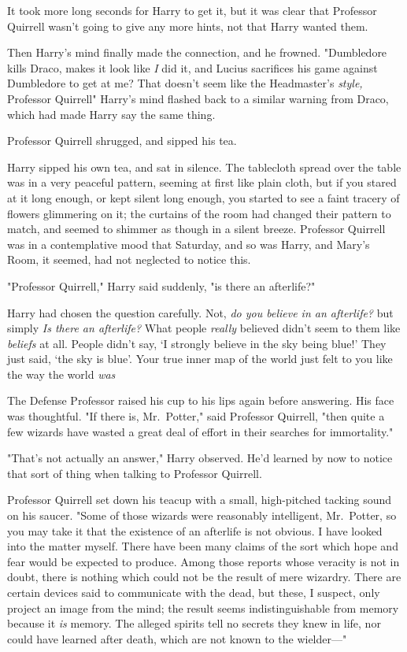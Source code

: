 It took more long seconds for Harry to get it, but it was clear that Professor
Quirrell wasn't going to give any more hints, not that Harry wanted them.

Then Harry's mind finally made the connection, and he frowned. "Dumbledore
kills Draco, makes it look like \emph{I} did it, and Lucius sacrifices his game
against Dumbledore to get at me? That{\el} doesn't seem like the
Headmaster's \emph{style,} Professor Quirrell{\el}" Harry's mind flashed
back to a similar warning from Draco, which had made Harry say the same thing.

Professor Quirrell shrugged, and sipped his tea.

Harry sipped his own tea, and sat in silence. The tablecloth spread over the
table was in a very peaceful pattern, seeming at first like plain cloth, but if
you stared at it long enough, or kept silent long enough, you started to see a
faint tracery of flowers glimmering on it; the curtains of the room had changed
their pattern to match, and seemed to shimmer as though in a silent breeze.
Professor Quirrell was in a contemplative mood that Saturday, and so was Harry,
and Mary's Room, it seemed, had not neglected to notice this.

"Professor Quirrell," Harry said suddenly, "is there an afterlife?"

Harry had chosen the question carefully. Not, \emph{do you believe in an
afterlife?} but simply \emph{Is there an afterlife?} What people \emph{really}
believed didn't seem to them like \emph{beliefs} at all. People didn't say, `I
strongly believe in the sky being blue!' They just said, `the sky is blue'.
Your true inner map of the world just felt to you like the way the world
\emph{was{\el}}

The Defense Professor raised his cup to his lips again before answering. His
face was thoughtful. "If there is, Mr.~Potter," said Professor Quirrell, "then
quite a few wizards have wasted a great deal of effort in their searches for
immortality."

"That's not actually an answer," Harry observed. He'd learned by now to notice
that sort of thing when talking to Professor Quirrell.

Professor Quirrell set down his teacup with a small, high-pitched tacking sound
on his saucer. "Some of those wizards were reasonably intelligent, Mr.~Potter,
so you may take it that the existence of an afterlife is not obvious. I have
looked into the matter myself. There have been many claims of the sort which
hope and fear would be expected to produce. Among those reports whose veracity
is not in doubt, there is nothing which could not be the result of mere
wizardry. There are certain devices said to communicate with the dead, but
these, I suspect, only project an image from the mind; the result seems
indistinguishable from memory because it \emph{is} memory. The alleged spirits
tell no secrets they knew in life, nor could have learned after death, which
are not known to the wielder---"

